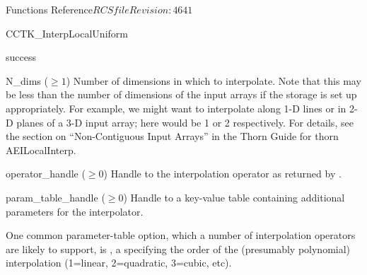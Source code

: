 \begin{cactuspart}{ Functions Reference}{$RCSfile$}{$Revision: 4641 $}
\begin{FunctionDescription}{CCTK\_InterpLocalUniform}
\begin{ResultSection}
\begin{Result}{0}
success
\end{Result}
\end{ResultSection}

\begin{ParameterSection}
\begin{Parameter}{N\_dims ($\ge 1$)}
Number of dimensions in which to interpolate.
Note that this may be less than the number of dimensions of the
input arrays if the storage is set up appropriately.  For example,
we might want to interpolate along 1-D lines or in 2-D planes of a
3-D input array; here  would be 1 or 2 respectively.
For details, see the section on ``Non-Contiguous Input Arrays''
in the Thorn Guide for thorn AEILocalInterp.
\end{Parameter}
\begin{Parameter}{operator\_handle ($\ge 0$)}
\hbox{}
Handle to the interpolation operator as returned by
.
\end{Parameter}
\begin{Parameter}{param\_table\_handle ($\ge 0$)}
Handle to a key-value table containing additional parameters for
the interpolator.

One common parameter-table option, which a number of interpolation
operators are likely to support, is , a 
specifying the order of the (presumably polynomial) interpolation
(1=linear, 2=quadratic, 3=cubic, etc).


\end{Parameter}
\end{ParameterSection}
\end{FunctionDescription}
\end{cactuspart}
